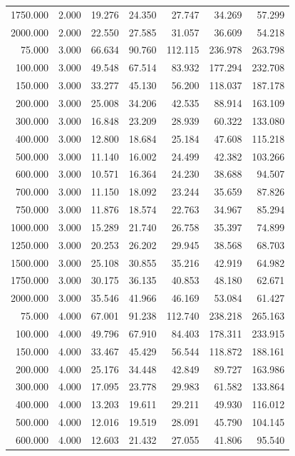 {\begin{longtable}{rrrrrrr}
1750.000 & 2.000 & 19.276 & 24.350 & 27.747 & 34.269 & 57.299 \\
2000.000 & 2.000 & 22.550 & 27.585 & 31.057 & 36.609 & 54.218 \\
75.000 & 3.000 & 66.634 & 90.760 & 112.115 & 236.978 & 263.798 \\
100.000 & 3.000 & 49.548 & 67.514 & 83.932 & 177.294 & 232.708 \\
150.000 & 3.000 & 33.277 & 45.130 & 56.200 & 118.037 & 187.178 \\
200.000 & 3.000 & 25.008 & 34.206 & 42.535 & 88.914 & 163.109 \\
300.000 & 3.000 & 16.848 & 23.209 & 28.939 & 60.322 & 133.080 \\
400.000 & 3.000 & 12.800 & 18.684 & 25.184 & 47.608 & 115.218 \\
500.000 & 3.000 & 11.140 & 16.002 & 24.499 & 42.382 & 103.266 \\
600.000 & 3.000 & 10.571 & 16.364 & 24.230 & 38.688 & 94.507 \\
700.000 & 3.000 & 11.150 & 18.092 & 23.244 & 35.659 & 87.826 \\
750.000 & 3.000 & 11.876 & 18.574 & 22.763 & 34.967 & 85.294 \\
1000.000 & 3.000 & 15.289 & 21.740 & 26.758 & 35.397 & 74.899 \\
1250.000 & 3.000 & 20.253 & 26.202 & 29.945 & 38.568 & 68.703 \\
1500.000 & 3.000 & 25.108 & 30.855 & 35.216 & 42.919 & 64.982 \\
1750.000 & 3.000 & 30.175 & 36.135 & 40.853 & 48.180 & 62.671 \\
2000.000 & 3.000 & 35.546 & 41.966 & 46.169 & 53.084 & 61.427 \\
75.000 & 4.000 & 67.001 & 91.238 & 112.740 & 238.218 & 265.163 \\
100.000 & 4.000 & 49.796 & 67.910 & 84.403 & 178.311 & 233.915 \\
150.000 & 4.000 & 33.467 & 45.429 & 56.544 & 118.872 & 188.161 \\
200.000 & 4.000 & 25.176 & 34.448 & 42.849 & 89.727 & 163.986 \\
300.000 & 4.000 & 17.095 & 23.778 & 29.983 & 61.582 & 133.864 \\
400.000 & 4.000 & 13.203 & 19.611 & 29.211 & 49.930 & 116.012 \\
500.000 & 4.000 & 12.016 & 19.519 & 28.091 & 45.790 & 104.145 \\
600.000 & 4.000 & 12.603 & 21.432 & 27.055 & 41.806 & 95.540 \\

\end{longtable}}
